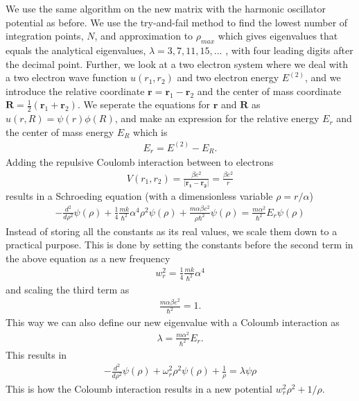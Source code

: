 \documentclass{article}
\begin{document}
We use the same algorithm on the new matrix with the harmonic oscillator potential as before. We use the try-and-fail method to find the lowest number of integration points, $N$, and approximation to $\rho_{max}$ which gives eigenvalues that equals the analytical eigenvalues, $\lambda=3, 7, 11, 15,...$ , with four leading digits after the decimal point.
\vskip0.7cm
Further, we look at a two electron system where we deal with a two electron wave function $u(r_1,r_2)$ and two electron energy $E^{(2)}$, and we introduce the relative coordinate $\mathbf{r} =\mathbf{r}_1-\mathbf{r}_2$ and the center of mass coordinate $\mathbf{R}=\frac{1}{2}(\mathbf{r}_1+\mathbf{r}_2)$.
We seperate the equations for $\mathbf{r}$ and $\mathbf{R}$ as $u(r,R)=\psi(r)\phi(R)$, and make an expression for the relative energy $E_r$ and the center of mass energy $E_R$ which is
\begin{align*}
  E_r=E^{(2)}-E_R.
\end{align*}
Adding the repulsive Coulomb interaction between to electrons
\begin{align*}
  V(r_1,r_2)=\frac{\beta e^2}{|\boldsymbol{r_1}-\boldsymbol{r_2}|} = \frac{\beta e^2}{r}
\end{align*}
results in a Schroeding equation (with a dimensionless variable $\rho=r/\alpha$)
\begin{align}
  -\frac{d^2}{d\rho^2}\psi(\rho)+\frac{1}{4}\frac{mk}{\hbar^2}\alpha^4\rho^2\psi(\rho)+\frac{m\alpha\beta e^2}{\rho \hbar^2}\psi(\rho) = \frac{m\alpha^2}{\hbar^2}E_r\psi(\rho)
\end{align}
Instead of storing all the constants as its real values, we scale them down to a practical purpose. This is done by setting the constants before the second term in the above equation as a new frequency
\begin{align*}
  w_r^2=\frac{1}{4}\frac{mk}{\hbar^2}\alpha^4
\end{align*}
and scaling the third term as
\begin{align*}
  \frac{m\alpha \beta e^2}{\hbar^2}=1.
\end{align*}
This way we can also define our new eigenvalue with a Coloumb interaction as
\begin{align*}
  \lambda = \frac{m\alpha^2}{\hbar^2}E_r.
\end{align*}
This results in
\begin{align*}
  -\frac{d^2}{d\rho^2}\psi(\rho)+\omega_r^2\rho^2\psi(\rho) + \frac{1}{\rho}= \lambda \psi\rho
\end{align*}
This is how the Coloumb interaction results in a new potential $w_r^2\rho^2 + 1/\rho$.
\end{document}
